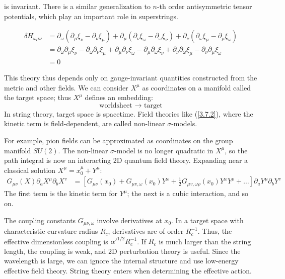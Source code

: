 is invariant. There is a similar generalization to $n$-th order antisymmetric tensor potentials, which play an important role in superstrings.
\begin{tcolorbox}
	$$\begin{aligned}
		\delta H_{\omega \mu \nu} & =\partial_\omega\left(\partial_\mu \xi_\nu-\partial_\nu \xi_\mu\right)+\partial_\mu\left(\partial_\nu \xi_\omega-\partial_\omega \xi_\nu\right)+\partial_\nu\left(\partial_\omega \xi_\mu-\partial_\mu \xi_\omega\right) \\
		& =\partial_\omega \partial_\mu \xi_\nu-\partial_\omega \partial_\nu \xi_\mu+\partial_\mu \partial_\nu \xi_\omega-\partial_\mu \partial_\omega \xi_\nu+\partial_\nu \partial_\omega \xi_\mu-\partial_\nu \partial_\mu \xi_\omega \\
		& =0
	\end{aligned}$$
\end{tcolorbox}
This theory thus depends only on gauge-invariant quantities constructed from the metric and other fields. We can consider $X^\mu$ as coordinates on a manifold called the target space; thus $X^\mu$ defines an embedding:
\begin{equation}
	\text { worldsheet } \rightarrow \text { target }
\end{equation}
In string theory, target space is spacetime. Field theories like (\ref{3.7.2}), where the kinetic term is field-dependent, are called non-linear $\sigma$-models.

For example, pion fields can be approximated as coordinates on the group manifold $SU(2)$. The non-linear $\sigma$-model is no longer quadratic in $X^\mu$, so the path integral is now an interacting 2D quantum field theory. Expanding near a classical solution $X^\mu = x_0^\mu + Y^\mu$:
\begin{equation}
	\begin{aligned}
		G_{\mu \nu}(X) \partial_{a} X^{\mu} \partial_{b} X^{v} &=\left[G_{\mu \nu}\left(x_{0}\right)+G_{\mu v, \omega}\left(x_{0}\right) Y^{\omega}+\frac{1}{2} G_{\mu v, \omega \rho}\left(x_{0}\right) Y^{\omega} Y^{\rho}+\ldots\right] \partial_{a} Y^{\mu} \partial_{b} Y^{v}
	\end{aligned}
\end{equation}
The first term is the kinetic term for $Y^\mu$; the next is a cubic interaction, and so on.

The coupling constants $G_{\mu\nu,\omega}$ involve derivatives at $x_0$. In a target space with characteristic curvature radius $R_c$, derivatives are of order $R_c^{-1}$. Thus, the effective dimensionless coupling is $\alpha'^{1/2} R_c^{-1}$. If $R_c$ is much larger than the string length, the coupling is weak, and 2D perturbation theory is useful. Since the wavelength is large, we can ignore the internal structure and use low-energy effective field theory. String theory enters when determining the effective action.

